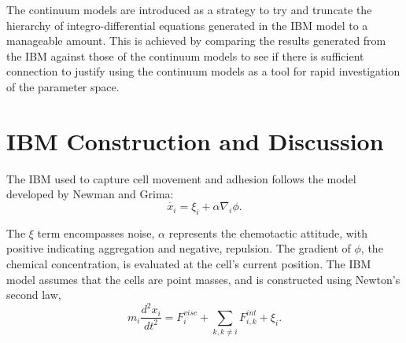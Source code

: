 \documentclass[12pt,letterpaper,cm]{article}
\renewcommand{\.}{\cdot}
\newcommand{\<}{\langle}
\renewcommand{\>}{\rangle}
\begin{document}
	The continuum models are introduced as a strategy to try and truncate the hierarchy of integro-differential equations generated in the IBM model to a manageable amount.  This is achieved by comparing the results generated from the IBM against those of the continuum models to see if there is sufficient connection to justify using the continuum models as a tool for rapid investigation of the parameter space.  
	
	\section{IBM Construction and Discussion}
	
	\indent 
	
	The IBM used to capture cell movement and adhesion follows the model developed by Newman and Grima: 
	\[\dot{x_i} = \xi_i + \alpha \nabla_i \phi.\]  
	
	The $\xi$ term encompasses noise, $\alpha$ represents the chemotactic attitude, with positive indicating aggregation and negative, repulsion. The gradient of $\phi$, the chemical concentration, is evaluated at the cell's current position.  The IBM model assumes that the cells are point masses, and is constructed using Newton's second law, 
	\[m_i \frac{d^{2}x_{i}}{dt^2}=F^{visc}_i+\sum_{k,k\neq i}F^{int}_{i,k}+\xi_i.\]
	
\end{document}
